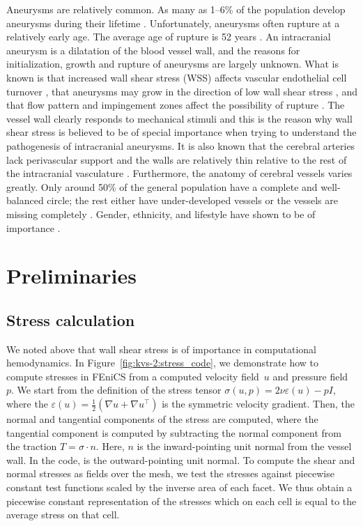 Aneurysms are relatively common. As many as 1--6\% of the population
develop aneurysms during their
lifetime \citep{Weir2002}. Unfortunately, aneurysms often rupture at a
relatively early age. The average age of rupture is 52
years \citep{Humphrey2001}. An intracranial aneurysm is a dilatation
of the blood vessel wall, and the reasons for initialization, growth
and rupture of aneurysms are largely unknown.  What is known is that
increased wall shear stress (WSS) affects vascular endothelial cell
turnover \citep{DAVIESREMUZZIGORDONEtAl1986}, that aneurysms may grow
in the direction of low wall shear
stress \citep{BousselRayzMcCullochEtAl2008}, and that flow pattern and
impingement zones affect the possibility of
rupture \citep{CebralCastroBurgessEtAl2005}. The vessel wall clearly
responds to mechanical stimuli and this is the reason why wall shear
stress is believed to be of special importance when trying to
understand the pathogenesis of intracranial aneurysms. It is also
known that the cerebral arteries lack perivascular support and the
walls are relatively thin relative to the rest of the intracranial
vasculature \citep{Humphrey2001,Stehbens1975}.  Furthermore, the
anatomy of cerebral vessels varies greatly. Only around 50\% of the
general population have a complete and well-balanced circle; the rest
either have under-developed vessels or the vessels are missing
completely \citep{Fung1984}. Gender, ethnicity, and lifestyle have
shown to be of
importance \citep{MhurchuAndersonJamrozikEtAl2001,LongstrethNelsonKoepsellEtAl1994,KongableLanzinoGermansonEtAl1996}.

\section{Preliminaries}

\subsection{Stress calculation}

We noted above that wall shear stress is of importance in
computational hemodynamics. In Figure~\ref{fig:kvs-2:stress_code}, we
demonstrate how to compute stresses in FEniCS from a computed velocity
field~$u$ and pressure field~$p$. We start from the definition of the
stress tensor $\sigma(u,p) = 2 \nu \varepsilon (u) - p I$, where the
$\varepsilon(u) = \frac{1}{2}(\nabla u + \nabla u^{\top})$ is the symmetric
velocity gradient. Then, the normal and tangential components of the
stress are computed, where the tangential component is computed by
subtracting the normal component from the traction $T = \sigma \cdot
n$. Here, $n$ is the inward-pointing unit normal from the vessel
wall. In the code,  is the outward-pointing unit normal. To
compute the shear and normal stresses as fields over the mesh, we test
the stresses against piecewise constant test functions scaled by the
inverse area of each facet. We thus obtain a piecewise constant
representation of the stresses which on each cell is equal to the
average stress on that cell.

